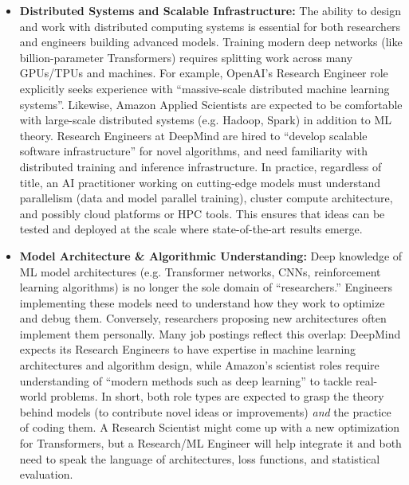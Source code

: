 \documentclass[pdflatex,sn-mathphys-num]{sn-jnl}%
\theoremstyle{thmstyleone}%
\theoremstyle{thmstyletwo}%
\theoremstyle{thmstylethree}%
\begin{document}
\begin{itemize}
\item \textbf{Distributed Systems and Scalable Infrastructure:} The ability to design and work with distributed computing systems is essential for both researchers and engineers building advanced models. Training modern deep networks (like billion-parameter Transformers) requires splitting work across many GPUs/TPUs and machines. For example, OpenAI’s Research Engineer role explicitly seeks experience with “massive-scale distributed machine learning systems”\cite{OpenAI-RE-Job}. Likewise, Amazon Applied Scientists are expected to be comfortable with large-scale distributed systems (e.g. Hadoop, Spark) in addition to ML theory. Research Engineers at DeepMind are hired to “develop scalable software infrastructure” for novel algorithms\cite{DeepMind-RE-2025}, and need familiarity with distributed training and inference infrastructure. In practice, regardless of title, an AI practitioner working on cutting-edge models must understand parallelism \citep{shoeybi2019megatron,rajbhandari2020zero}(data and model parallel training), cluster compute architecture, and possibly cloud platforms or HPC tools. This ensures that ideas can be tested and deployed at the scale where state-of-the-art results emerge. 

\item \textbf{Model Architecture \& Algorithmic Understanding:} Deep knowledge of ML model architectures (e.g. Transformer networks, CNNs, reinforcement learning algorithms) is no longer the sole domain of “researchers.” Engineers implementing these models need to understand how they work to optimize and debug them. Conversely, researchers proposing new architectures often implement them personally. Many job postings reflect this overlap: DeepMind expects its Research Engineers to have expertise in machine learning architectures and algorithm design\cite{DeepMind-RE-2025}, while Amazon’s scientist roles require understanding of “modern methods such as deep learning” to tackle real-world problems. In short, both role types are expected to grasp the theory behind models (to contribute novel ideas or improvements) \emph{and} the practice of coding them. A Research Scientist might come up with a new optimization for Transformers, but a Research/ML Engineer will help integrate it and both need to speak the language of architectures, loss functions, and statistical evaluation. 


\end{itemize}
\end{document}
